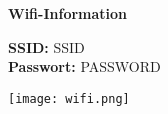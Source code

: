 \documentclass[12pt, a6paper, DIV12, final]{scrreprt}
\begin{document}
\center

\huge
\textbf{Wifi-Information}

\bigskip
\bigskip

\normalsize

\textbf{SSID:} {{ SSID }} \\
\medskip
\textbf{Passwort:} {{ PASSWORD }}

\texttt{[image: wifi.png]}
\end{document}
